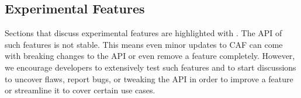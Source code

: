 \subsection{Experimental Features}

Sections that discuss experimental features are highlighted with \experimental.
The API of such features is not stable. This means even minor updates to CAF
can come with breaking changes to the API or even remove a feature completely.
However, we encourage developers to extensively test such features and to start
discussions to uncover flaws, report bugs, or tweaking the API in order to
improve a feature or streamline it to cover certain use cases.
